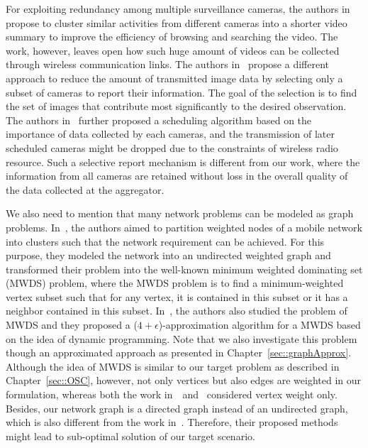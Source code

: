 For exploiting redundancy among multiple surveillance cameras, the authors in~\cite{ClusteredSynopsis} propose to cluster similar activities from different cameras into a shorter video summary to improve the efficiency of browsing and searching the video.
The work, however, leaves open how such huge amount of videos can be collected through wireless communication links.
The authors in~\cite{CameraSelection} propose a different approach to reduce the amount of transmitted image data by selecting only a subset of cameras to report their information.
The goal of the selection is to find the set of images that contribute most significantly to the desired observation.
The authors in~\cite{CorrAwareScheduling} further proposed a scheduling algorithm based on the importance of data collected by each cameras, and the transmission of later scheduled cameras might be dropped due to the constraints of wireless radio resource.
Such a selective report mechanism is different from our work, where the information from all cameras are retained without loss in the overall quality of the data collected at the aggregator.
%

We also need to mention that many network problems can be modeled as graph problems.
In~\cite{MWDS_baseline}, the authors aimed to partition weighted nodes of a mobile network into clusters such that the network requirement can be achieved.
For this purpose, they modeled the network into an undirected weighted graph and transformed their problem into the well-known minimum weighted dominating set (MWDS) problem, where the MWDS problem is to find a minimum-weighted vertex subset such that for any vertex, it is contained in this subset or it has a neighbor contained in this subset.
In~\cite{newAppMWDS}, the authors also studied the problem of MWDS and they proposed a ($4+\epsilon$)-approximation algorithm for a MWDS based on the idea of dynamic programming.
Note that we also investigate this problem though an approximated approach as presented in Chapter~\ref{sec::graphApprox}.
Although the idea of MWDS is similar to our target problem as described in Chapter~\ref{sec::OSC}, however, not only vertices but also edges are weighted in our formulation, whereas both the work in~\cite{MWDS_baseline}~and~\cite{newAppMWDS} considered vertex weight only.
Besides, our network graph is a directed graph instead of an undirected graph, which is also different from the work in~\cite{MWDS_baseline,newAppMWDS}.
Therefore, their proposed methods might lead to sub-optimal solution of our target scenario. 
